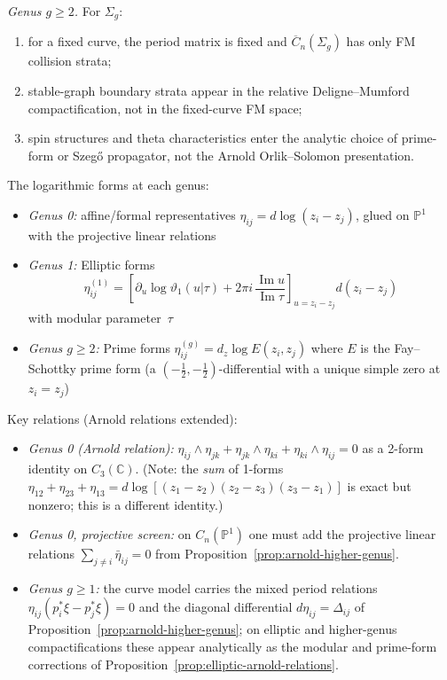 \begin{example}
\emph{Genus $g \geq 2$.} For $\Sigma_g$:
\begin{enumerate}
\item for a fixed curve, the period matrix is fixed and
$\overline C_n(\Sigma_g)$ has only FM collision strata;
\item stable-graph boundary strata appear in the relative
Deligne--Mumford compactification, not in the fixed-curve FM space;
\item spin structures and theta characteristics enter the analytic
choice of prime-form or Szeg\H{o} propagator, not the Arnold
Orlik--Solomon presentation.
\end{enumerate}

The logarithmic forms at each genus:
\begin{itemize}
\item \emph{Genus 0:} affine/formal representatives
\(\eta_{ij}=d\log(z_i-z_j)\), glued on \(\mathbb P^1\) with the
projective linear relations
\item \emph{Genus 1:} Elliptic forms
\[
\eta_{ij}^{(1)}
=
\left[
\partial_u\log\vartheta_1(u|\tau)
+2\pi i\,\frac{\operatorname{Im}u}{\operatorname{Im}\tau}
\right]_{u=z_i-z_j}d(z_i-z_j)
\]
with modular parameter~$\tau$
\item \emph{Genus $g \geq 2$:} Prime forms $\eta_{ij}^{(g)} = d_z\log E(z_i, z_j)$ where $E$ is the Fay--Schottky prime form (a $(-\tfrac{1}{2},-\tfrac{1}{2})$-differential with a unique simple zero at $z_i = z_j$)
\end{itemize}

Key relations (Arnold relations extended):
\begin{itemize}
\item \emph{Genus 0 (Arnold relation):}
$\eta_{ij} \wedge \eta_{jk} + \eta_{jk} \wedge \eta_{ki} + \eta_{ki} \wedge \eta_{ij} = 0$
as a 2-form identity on $C_3(\mathbb{C})$. (Note: the \emph{sum} of 1-forms
$\eta_{12} + \eta_{23} + \eta_{13} = d\log[(z_1{-}z_2)(z_2{-}z_3)(z_3{-}z_1)]$
is exact but nonzero; this is a different identity.)
\item \emph{Genus 0, projective screen:} on $C_n(\mathbb{P}^1)$ one must add
the projective linear relations
$\sum_{j\neq i}\bar\eta_{ij}=0$
from Proposition~\ref{prop:arnold-higher-genus}.
\item \emph{Genus $g \geq 1$:} the curve model carries the mixed period
relations
$\eta_{ij}(p_i^*\xi-p_j^*\xi)=0$
and the diagonal differential
$d\eta_{ij}=\Delta_{ij}$
of Proposition~\ref{prop:arnold-higher-genus}; on elliptic and
higher-genus compactifications these appear analytically as the modular
and prime-form corrections of
Proposition~\ref{prop:elliptic-arnold-relations}.
\end{itemize}


\end{example}
